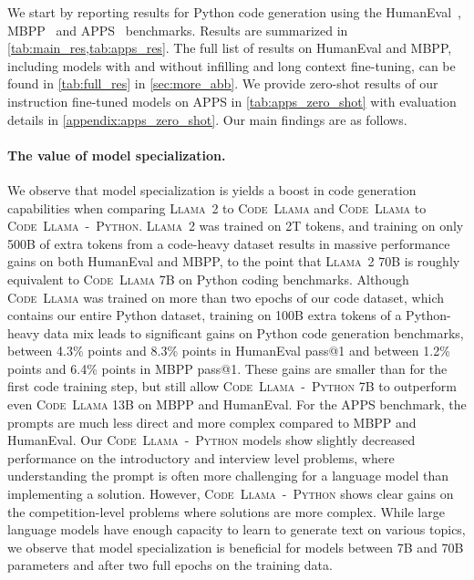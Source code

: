 We start by reporting results for Python code generation using the HumanEval~\citep{chen2021evaluating}, MBPP~\citep{austin2021program} and APPS~\citep{hendrycks2021measuring} benchmarks. Results are summarized in \ref{tab:main_res,tab:apps_res}. The full list of results on HumanEval and MBPP, including models with and without infilling and long context fine-tuning, can be found in \ref{tab:full_res} in \ref{sec:more_abb}. We provide zero-shot results of our instruction fine-tuned models on APPS in \ref{tab:apps_zero_shot} with evaluation details in \ref{appendix:apps_zero_shot}. Our main findings are as follows.

\paragraph{The value of model specialization.} We observe that model specialization is yields a boost in code generation capabilities when comparing \textsc{Llama~2} to \textsc{Code~Llama} and \textsc{Code~Llama} to \textsc{Code~Llama~-~Python}. \textsc{Llama~2} was trained on 2T tokens, and training on only 500B of extra tokens from a code-heavy dataset results in massive performance gains on both HumanEval and MBPP, to the point that \textsc{Llama~2} 70B is roughly equivalent to \textsc{Code~Llama} 7B on Python coding benchmarks. Although \textsc{Code~Llama} was trained on more than two epochs of our code dataset, which contains our entire Python dataset, training on 100B extra tokens of a Python-heavy data mix leads to significant gains on Python code generation benchmarks, between 4.3\% points and 8.3\% points in HumanEval pass@1 and between 1.2\% points and 6.4\% points in MBPP pass@1. These gains are smaller than for the first code training step, but still allow \textsc{Code~Llama~-~Python} 7B to outperform even \textsc{Code~Llama} 13B on MBPP and HumanEval. For the APPS benchmark, the prompts are much less direct and more complex compared to MBPP and HumanEval. Our \textsc{Code~Llama~-~Python} models show slightly decreased performance on the introductory and interview level problems, where understanding the prompt is often more challenging for a language model than implementing a solution. However, \textsc{Code~Llama~-~Python} shows clear gains on the competition-level problems where solutions are more complex. While large language models have enough capacity to learn to generate text on various topics, we observe that model specialization is beneficial for models between 7B and 70B parameters and after two full epochs on the training data. 

